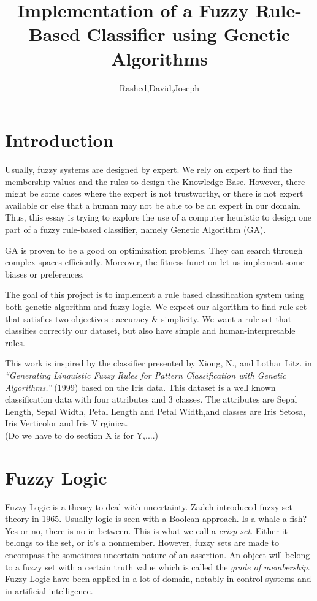 \documentclass[a4paper,12pt]{article}
\begin{document}
\title{Implementation of a Fuzzy Rule-Based Classifier using Genetic Algorithms}
\author{Rashed,David,Joseph}
\maketitle



\section{Introduction}

Usually, fuzzy systems are designed by expert. We rely on expert to find the membership values and the rules to design the Knowledge Base.
However, there might be some cases where the expert is not trustworthy, or there is not expert available or else that a human may not be able to be an expert in our domain. Thus, this essay is trying to explore the use of a computer heuristic to design one part of a fuzzy rule-based classifier, namely Genetic Algorithm (GA).

GA is proven to be a good on optimization problems. They can search through complex spaces efficiently. Moreover, the fitness function let us implement some biases or preferences.

The goal of this project is to implement a rule based classification system using both genetic algorithm and fuzzy logic.
We expect our algorithm to find rule set that satisfies two objectives : accuracy \& simplicity.
We want a rule set that classifies correctly our dataset, but also have simple and human-interpretable rules. 

This work is inspired by the classifier presented by Xiong, N., and Lothar Litz. in \textit{“Generating Linguistic Fuzzy Rules for Pattern Classification with Genetic Algorithms.”} (1999) based on the Iris data. This dataset is a well known classification data with four attributes and 3 classes. The attributes are Sepal Length, Sepal Width, Petal Length and Petal Width,and classes are Iris Setosa, Iris Verticolor and Iris Virginica. \\

(Do we have to do section X is for Y,....)

\section{Fuzzy Logic}

Fuzzy Logic is a theory to deal with uncertainty.
Zadeh introduced fuzzy set theory in 1965. Usually logic is seen with a Boolean approach. Is a whale a fish? Yes or no, there is no in between. This is what we call a \textit{crisp set}. Either it belongs to the set, or it's a nonmember. 
However, fuzzy sets are made to encompass the sometimes uncertain nature of an assertion. An object will belong to a fuzzy set with a certain truth value which is called the \textit{grade of membership}.
Fuzzy Logic have been applied in a lot of domain, notably in control systems and in artificial intelligence.
\end{document}
